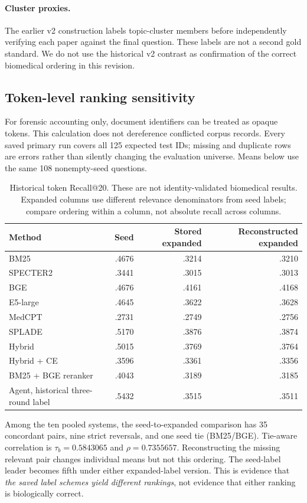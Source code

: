 \documentclass{article}
\begin{document}
\paragraph{Cluster proxies.}
The earlier v2 construction labels topic-cluster members before independently
verifying each paper against the final question. These labels are not a second
gold standard. We do not use the historical v2 contrast as confirmation of the
correct biomedical ordering in this revision.

\subsection{Token-level ranking sensitivity}
For forensic accounting only, document identifiers can be treated as opaque
tokens. This calculation does not dereference conflicted corpus records. Every
saved primary run covers all 125 expected test IDs; missing and duplicate rows
are errors rather than silently changing the evaluation universe. Means below
use the same 108 nonempty-seed questions.

\begin{table}[t]
\centering\small
\caption{Historical token Recall@20. These are not identity-validated biomedical
results. Expanded columns use different relevance denominators from seed labels;
compare ordering within a column, not absolute recall across columns.}
\begin{tabular}{lrrr}
\toprule
Method & Seed & Stored expanded & Reconstructed expanded\\
\midrule
BM25 & .4676 & .3214 & .3210\\
SPECTER2 & .3441 & .3015 & .3013\\
BGE & .4676 & .4161 & .4168\\
E5-large & .4645 & .3622 & .3628\\
MedCPT & .2731 & .2749 & .2756\\
SPLADE & .5170 & .3876 & .3874\\
Hybrid & .5015 & .3769 & .3764\\
Hybrid + CE & .3596 & .3361 & .3356\\
BM25 + BGE reranker & .4043 & .3189 & .3185\\
Agent, historical three-round label & .5432 & .3515 & .3511\\
\bottomrule
\end{tabular}
\end{table}

Among the ten pooled systems, the seed-to-expanded comparison has 35 concordant
pairs, nine strict reversals, and one seed tie (BM25/BGE). Tie-aware correlation is
$\tau_b=0.5843065$ and $\rho=0.7355657$. Reconstructing the missing relevant pair
changes individual means but not this ordering. The seed-label leader becomes
fifth under either expanded-label version. This is evidence that \emph{the saved
label schemes yield different rankings}, not evidence that either ranking is
biologically correct.
\end{document}

